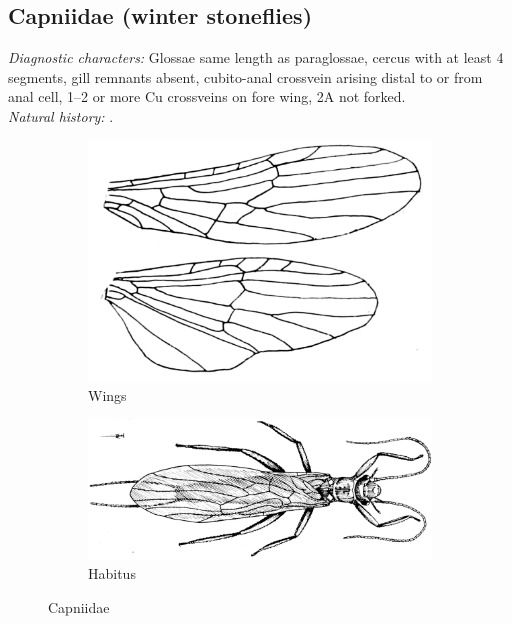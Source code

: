 \documentclass[letterpaper, 11pt]{article}
\begin{document}
\subsection{Capniidae (winter stoneflies)}
\noindent{}\textit{Diagnostic characters:} Glossae same length as paraglossae, cercus with at least 4 segments, gill remnants absent, cubito-anal crossvein arising distal to or from anal cell, 1--2 or more Cu crossveins on fore wing, 2A not forked.\\

\noindent{}\textit{Natural history:} .\\

\begin{figure}[ht!]
    \centering
    \begin{subfigure}[ht!]{0.4\textwidth}
        \includegraphics[width=\textwidth]{CapniidWings}
        \caption{Wings \citep[modified from][Plate 47, Fig. 2]{bhl29875}}
        \label{fig:capniid1}
    \end{subfigure}
    \qquad
    \begin{subfigure}[ht!]{0.5\textwidth}
        \includegraphics[width=\textwidth]{CapniidHabitus}
        \caption{Habitus \citep[modified from][Fig. 28]{bhl29875}}
        \label{fig:capniid2}
    \end{subfigure}
    \caption{Capniidae}\label{fig:capniids}
\end{figure}
\end{document}
